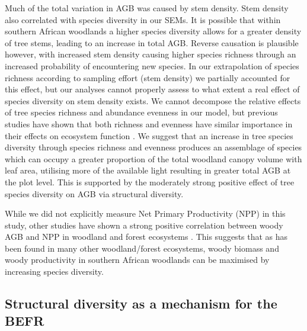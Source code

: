 \documentclass[11pt,a4paper]{article}
\begin{document}
Much of the total variation in AGB was caused by stem density. Stem density also correlated with species diversity in our SEMs. It is possible that within southern African woodlands a higher species diversity allows for a greater density of tree stems, leading to an increase in total AGB. Reverse causation is plausible however, with increased stem density causing higher species richness through an increased probability of encountering new species. In our extrapolation of species richness according to sampling effort (stem density) we partially accounted for this effect, but our analyses cannot properly assess to what extent a real effect of species diversity on stem density exists. We cannot decompose the relative effects of tree species richness and abundance evenness in our model, but previous studies have shown that both richness and evenness have similar importance in their effects on ecosystem function \citep{Valery2009, Zhang2012}. We suggest that an increase in tree species diversity through species richness and evenness produces an assemblage of species which can occupy a greater proportion of the total woodland canopy volume with leaf area, utilising more of the available light resulting in greater total AGB at the plot level. This is supported by the moderately strong positive effect of tree species diversity on AGB via structural diversity.



While we did not explicitly measure Net Primary Productivity (NPP) in this study, other studies have shown a strong positive correlation between woody AGB and NPP in woodland and forest ecosystems \citep{Chisholm2013, Prado-Junior2016}. This suggests that as has been found in many other woodland/forest ecosystems, woody biomass and woody productivity in southern African woodlands can be maximised by increasing species diversity. 

\subsection{Structural diversity as a mechanism for the BEFR}
\end{document}
